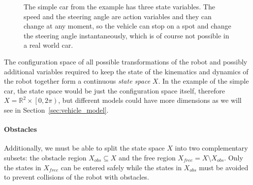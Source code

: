 \begin{figure}
		
	\caption{The simple car from the example has three state variables. The speed and the steering angle are action variables and they can change at any moment, so the vehicle can stop on a spot and change the steering angle instantaneously, which is of course not possible in a real world car.}
	\label{fig:simple_car}
\end{figure}

The configuration space of all possible transformations of the robot and possibly additional variables required to keep the state of the kinematics and dynamics of the robot together form a continuous \textit{state space} $X$. In the example of the simple car, the state space would be just the configuration space itself, therefore $X=\mathbb{R}^2\times\left[0,2\pi\right)$, but different models could have more dimensions as we will see in Section~\ref{sec:vehicle_model}.

\paragraph{Obstacles}

Additionally, we must be able to split the state space $X$ into two complementary subsets: the obstacle region $X_{obs}\subseteq X$ and the free region $X_{free}=X\setminus X_{obs}$. Only the states in $X_{free}$ can be entered safely while the states in $X_{obs}$ must be avoided to prevent collisions of the robot with obstacles.

